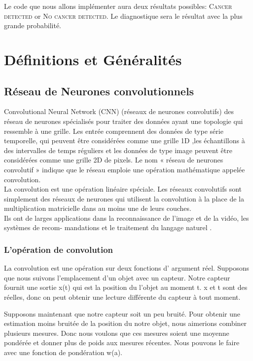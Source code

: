 \documentclass[a4paper,11pt]{report}
\begin{document}
Le code que nous allons implémenter aura deux résultats possibles: \textsc{Cancer detected} or \textsc{No cancer detected}. Le diagnostique sera le résultat avec la plus grande probabilité.


\chapter{Définitions et Généralités}
\section{Réseau de Neurones convolutionnels}
Convolutional Neural Network (CNN) (réseaux de neurones convolutifs) des réseau de
neurones spécialisés pour traiter des données ayant une topologie qui ressemble à une grille. Les entrée
comprennent des données de type série temporelle, qui peuvent être considérées comme une grille 1D ,les échantillons à des intervalles de temps réguliers et les données de type image peuvent
être considérées comme une grille 2D de pixels. Le nom « réseau de neurones convolutif » indique que le réseau emploie
une opération mathématique appelée convolution.\\
La convolution est une opération linéaire spéciale. Les réseaux convolutifs sont simplement des réseaux de neurones qui utilisent la convolution à la place de la
multiplication matricielle dans au moins une de leurs couches.\\
Ils ont de larges applications dans la reconnaissance de l’image et de la vidéo, les systèmes de recom-
mandations et le traitement du langage naturel .

\subsection {L’opération de convolution}
La convolution est une opération sur deux fonctions d’ argument réel.
Supposons que nous suivons l’emplacement d’un objet avec un capteur. Notre capteur fournit une sortie x(t) qui est la position du l'objet au moment t. x et t sont des réelles,
donc on peut obtenir une lecture différente du capteur à tout moment.

Supposons maintenant que notre capteur soit un peu bruité. Pour obtenir une estimation
moins bruitée de la position du notre objet, nous aimerions combiner plusieurs mesures.
Donc nous voulons que ces mesures soient une moyenne pondérée et donner plus de poids aux mesures récentes.
Nous pouvons le faire avec une fonction de
pondération w(a).
\end{document}

